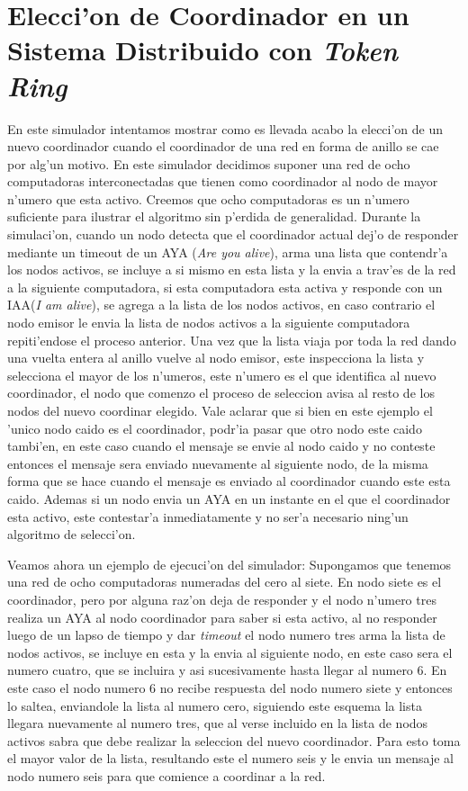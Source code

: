 \section{Elecci'on de Coordinador en un Sistema Distribuido con \emph{Token Ring}}
En este simulador intentamos mostrar como es llevada acabo la elecci'on de un nuevo coordinador cuando el coordinador de una red en forma de anillo se cae por alg'un motivo.
En este simulador decidimos suponer una red de ocho computadoras interconectadas que tienen como coordinador al nodo de mayor n'umero que esta activo. Creemos que ocho computadoras es un n'umero suficiente para ilustrar el algoritmo sin p'erdida de generalidad.
Durante la simulaci'on, cuando un nodo detecta que el coordinador actual dej'o de responder mediante un timeout de un AYA (\emph{Are you alive}), arma una lista que contendr'a los nodos activos, se incluye a si mismo en esta lista y la envia a trav'es de la red a la siguiente computadora, si esta computadora esta activa y responde con un IAA(\emph{I am alive}), se agrega a la lista de los nodos activos, en caso contrario el nodo emisor le envia la lista de nodos activos a la siguiente computadora repiti'endose el proceso anterior. Una vez que la lista viaja por toda la red dando una vuelta entera al anillo vuelve al nodo emisor, este inspecciona la lista y selecciona el mayor de los n'umeros, este n'umero es el que identifica al nuevo coordinador, el nodo que comenzo el proceso de seleccion avisa al resto de los nodos del nuevo coordinar elegido. Vale aclarar que si bien en este ejemplo el 'unico nodo caido es el coordinador, podr'ia pasar que otro nodo este caido tambi'en, en este caso cuando el mensaje se envie al nodo caido y no conteste entonces el mensaje sera enviado nuevamente al siguiente nodo, de la misma forma que se hace cuando el mensaje es enviado al coordinador cuando este esta caido. Ademas si un nodo envia un AYA en un instante en el que el coordinador esta activo, este contestar'a inmediatamente y no ser'a necesario ning'un algoritmo de selecci'on.

Veamos ahora un ejemplo de ejecuci'on del simulador:
Supongamos que tenemos una red de ocho computadoras numeradas del cero al siete. En nodo siete es el coordinador, pero por alguna raz'on deja de responder y el nodo n'umero tres realiza un AYA al nodo coordinador para saber si esta activo, al no responder luego de un lapso de tiempo y dar \emph{timeout} el nodo numero tres arma la lista de nodos activos, se incluye en esta y la envia al siguiente nodo, en este caso sera el numero cuatro, que se incluira y asi sucesivamente hasta llegar al numero 6. En este caso el nodo numero 6 no recibe respuesta del nodo numero siete y entonces lo saltea, enviandole la lista al numero cero, siguiendo este esquema la lista llegara nuevamente al numero tres, que al verse incluido en la lista de nodos activos sabra que debe realizar la seleccion del nuevo coordinador. Para esto toma el mayor valor de la lista, resultando este el numero seis y le envia un mensaje al nodo numero seis para que comience a coordinar a la red.


